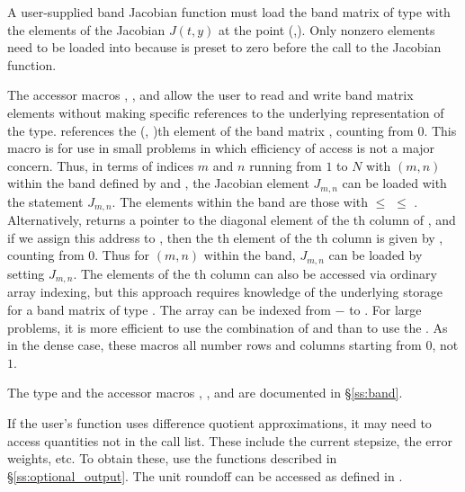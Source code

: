 {
  A user-supplied band Jacobian function must load the band matrix 
  of type  with the elements of the Jacobian $J(t,y)$ at the
  point (,).  Only nonzero elements need to be loaded into
   because  is preset to zero before the call to the
  Jacobian function.  

  The accessor macros , , and  
  allow the user to read and write band matrix elements without making specific 
  references to the underlying representation of the  type.
   references the (, )th element of the 
  band matrix , counting from $0$.
  This macro is for use in small problems in which efficiency of access is not
  a major concern.  Thus, in terms of indices $m$ and $n$ running from $1$ to
  $N$ with $(m,n)$ within the band defined by  and
  , the Jacobian element $J_{m,n}$ can be loaded with the 
  statement  $J_{m,n}$. The elements within
  the band are those with  $\le$  $\le$ .
  Alternatively,  returns a pointer to the diagonal element
  of the th column of , and if we assign this address to 
  , then the th element of the th column is
  given by , counting from $0$.
  Thus for $(m,n)$ within the band, $J_{m,n}$ can be loaded by setting 
   
  $J_{m,n}$.  The elements of the th column can also be accessed
  via ordinary array indexing, but this approach requires knowledge of
  the underlying storage for a band matrix of type .  
  The array  can be indexed from $-$ to .
  For large problems, it is more efficient to use the combination of
   and  than to use the
  .  As in the dense case, these macros all number rows
  and columns starting from $0$, not $1$.  

  The  type and the accessor macros , ,
  and  are documented in \S\ref{ss:band}.

  If the user's  function uses difference quotient approximations,
  it may need to access quantities not in the call list. These include the current
  stepsize, the error weights, etc. To obtain these, use the 
  functions described in \S\ref{ss:optional_output}. The unit roundoff can be
  accessed as  defined in .
}

